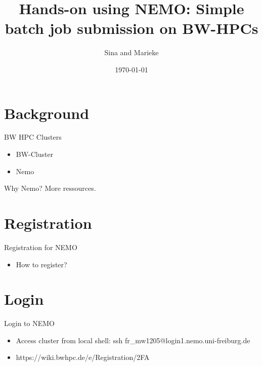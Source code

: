 \documentclass{beamer}
\title[Joint lab meeting]{Hands-on using NEMO: Simple batch job submission on BW-HPCs}
\author{Sina and Marieke}
\institute{}
\date{\today}
\begin{document}
\begin{frame}
  \titlepage
\end{frame}


\section{Background}

\begin{frame}{BW HPC Clusters}

\begin{itemize}
  \item BW-Cluster
  \item Nemo
\end{itemize}

\vskip 1cm

\begin{block}{Why Nemo?}
More ressources.
\end{block}

\end{frame}

\section{Registration}


\begin{frame}{Registration for NEMO}

\begin{itemize}
\item How to register?
\end{itemize}


\end{frame}

\section{Login}


\begin{frame}{Login to NEMO}


\begin{itemize}
    \item Access cluster from local shell: ssh fr\_mw1205@login1.nemo.uni-freiburg.de
    \item https://wiki.bwhpc.de/e/Registration/2FA
\end{itemize}

\end{frame}
\end{document}
